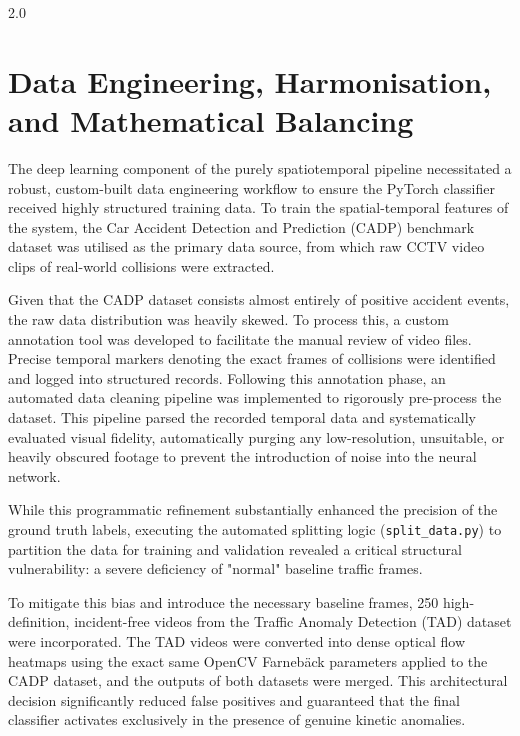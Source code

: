 \begin{spacing}{2.0}
\section{Data Engineering, Harmonisation, and Mathematical Balancing}
The deep learning component of the purely spatiotemporal pipeline necessitated a robust, custom-built data engineering workflow to ensure the PyTorch classifier received highly structured training data. To train the spatial-temporal features of the system, the Car Accident Detection and Prediction (CADP) benchmark dataset was utilised as the primary data source, from which raw CCTV video clips of real-world collisions were extracted.

Given that the CADP dataset consists almost entirely of positive accident events, the raw data distribution was heavily skewed. To process this, a custom annotation tool was developed to facilitate the manual review of video files. Precise temporal markers denoting the exact frames of collisions were identified and logged into structured records. Following this annotation phase, an automated data cleaning pipeline was implemented to rigorously pre-process the dataset. This pipeline parsed the recorded temporal data and systematically evaluated visual fidelity, automatically purging any low-resolution, unsuitable, or heavily obscured footage to prevent the introduction of noise into the neural network.

While this programmatic refinement substantially enhanced the precision of the ground truth labels, executing the automated splitting logic (\texttt{split\_data.py}) to partition the data for training and validation revealed a critical structural vulnerability: a severe deficiency of "normal" baseline traffic frames.

To mitigate this bias and introduce the necessary baseline frames, 250 high-definition, incident-free videos from the Traffic Anomaly Detection (TAD) dataset were incorporated. The TAD videos were converted into dense optical flow heatmaps using the exact same OpenCV Farnebäck parameters applied to the CADP dataset, and the outputs of both datasets were merged. This architectural decision significantly reduced false positives and guaranteed that the final classifier activates exclusively in the presence of genuine kinetic anomalies.


\end{spacing}
